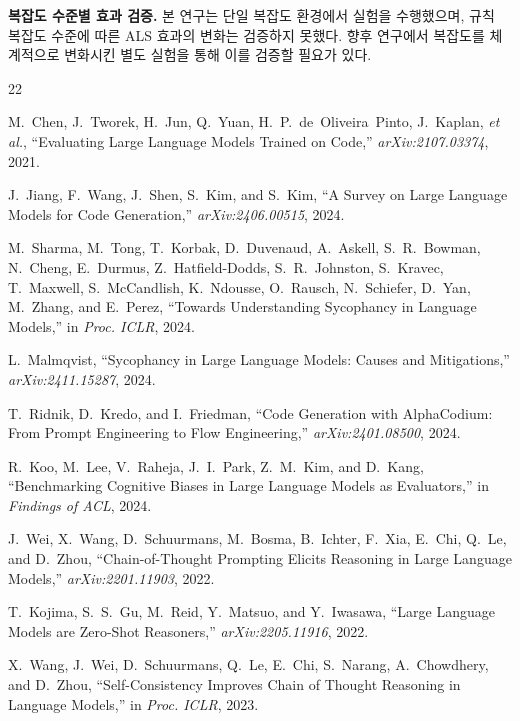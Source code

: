 \documentclass[conference]{IEEEtran}
\begin{document}
\textbf{복잡도 수준별 효과 검증.} 본 연구는 단일 복잡도 환경에서 실험을 수행했으며, 규칙 복잡도 수준에 따른 ALS 효과의 변화는 검증하지 못했다. 향후 연구에서 복잡도를 체계적으로 변화시킨 별도 실험을 통해 이를 검증할 필요가 있다.


\begin{thebibliography}{22}

M.~Chen, J.~Tworek, H.~Jun, Q.~Yuan, H.~P.~de~Oliveira~Pinto, J.~Kaplan, \emph{et al.}, ``Evaluating Large Language Models Trained on Code,'' \emph{arXiv:2107.03374}, 2021.

J.~Jiang, F.~Wang, J.~Shen, S.~Kim, and S.~Kim, ``A Survey on Large Language Models for Code Generation,'' \emph{arXiv:2406.00515}, 2024.

M.~Sharma, M.~Tong, T.~Korbak, D.~Duvenaud, A.~Askell, S.~R.~Bowman, N.~Cheng, E.~Durmus, Z.~Hatfield-Dodds, S.~R.~Johnston, S.~Kravec, T.~Maxwell, S.~McCandlish, K.~Ndousse, O.~Rausch, N.~Schiefer, D.~Yan, M.~Zhang, and E.~Perez, ``Towards Understanding Sycophancy in Language Models,'' in \emph{Proc. ICLR}, 2024.

L.~Malmqvist, ``Sycophancy in Large Language Models: Causes and Mitigations,'' \emph{arXiv:2411.15287}, 2024.

T.~Ridnik, D.~Kredo, and I.~Friedman, ``Code Generation with AlphaCodium: From Prompt Engineering to Flow Engineering,'' \emph{arXiv:2401.08500}, 2024.

R.~Koo, M.~Lee, V.~Raheja, J.~I.~Park, Z.~M.~Kim, and D.~Kang, ``Benchmarking Cognitive Biases in Large Language Models as Evaluators,'' in \emph{Findings of ACL}, 2024.

J.~Wei, X.~Wang, D.~Schuurmans, M.~Bosma, B.~Ichter, F.~Xia, E.~Chi, Q.~Le, and D.~Zhou, ``Chain-of-Thought Prompting Elicits Reasoning in Large Language Models,'' \emph{arXiv:2201.11903}, 2022.

T.~Kojima, S.~S.~Gu, M.~Reid, Y.~Matsuo, and Y.~Iwasawa, ``Large Language Models are Zero-Shot Reasoners,'' \emph{arXiv:2205.11916}, 2022.

X.~Wang, J.~Wei, D.~Schuurmans, Q.~Le, E.~Chi, S.~Narang, A.~Chowdhery, and D.~Zhou, ``Self-Consistency Improves Chain of Thought Reasoning in Language Models,'' in \emph{Proc. ICLR}, 2023.


\end{thebibliography}
\end{document}
